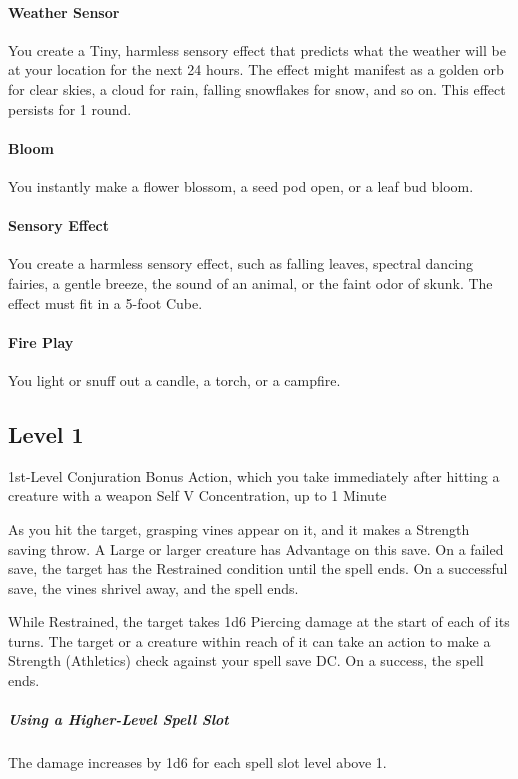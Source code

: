 \documentclass[letterpaper,openany,oneside,twocolumn]{book}
\begin{document}
\paragraph*{Weather Sensor} You create a Tiny, harmless sensory effect that predicts what the weather will be at your location for the next 24 hours. The effect might manifest as a golden orb for clear skies, a cloud for rain, falling snowflakes for snow, and so on. This effect persists for 1 round.

\paragraph*{Bloom} You instantly make a flower blossom, a seed pod open, or a leaf bud bloom.

\paragraph*{Sensory Effect} You create a harmless sensory effect, such as falling leaves, spectral dancing fairies, a gentle breeze, the sound of an animal, or the faint odor of skunk. The effect must fit in a 5-foot Cube.

\paragraph*{Fire Play} You light or snuff out a candle, a torch, or a campfire.

\subsection*{Level 1}
	{1st-Level Conjuration}
	{Bonus Action, which you take immediately after hitting a creature with a weapon}
	{Self}
	{V}
	{Concentration, up to 1 Minute}

As you hit the target, grasping vines appear on it, and it makes a Strength saving throw. A Large or larger creature has Advantage on this save. On a failed save, the target has the Restrained condition until the spell ends. On a successful save, the vines shrivel away, and the spell ends.

While Restrained, the target takes 1d6 Piercing damage at the start of each of its turns. The target or a creature within reach of it can take an action to make a Strength (Athletics) check against your spell save DC. On a success, the spell ends.

\subparagraph*{Using a Higher-Level Spell Slot} The damage increases by 1d6 for each spell slot level above 1.
\end{document}
